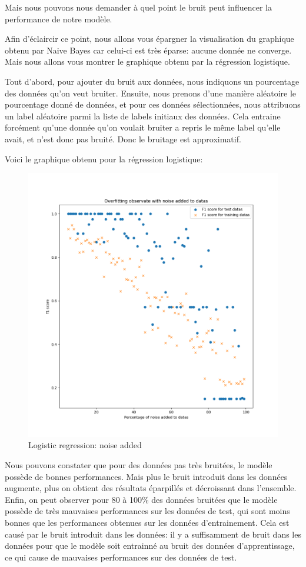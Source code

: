 \documentclass[
]{article}
\begin{document}
Mais nous pouvons nous demander à quel point le bruit peut influencer la
performance de notre modèle.

Afin d'éclaircir ce point, nous allons vous épargner la visualisation du
graphique obtenu par Naive Bayes car celui-ci est très éparse: aucune
donnée ne converge. Mais nous allons vous montrer le graphique obtenu
par la régression logistique.

Tout d'abord, pour ajouter du bruit aux données, nous indiquons un
pourcentage des données qu'on veut bruiter. Ensuite, nous prenons d'une
manière aléatoire le pourcentage donné de données, et pour ces données
sélectionnées, nous attribuons un label aléatoire parmi la liste de
labels initiaux des données. Cela entraine forcément qu'une donnée qu'on
voulait bruiter a repris le même label qu'elle avait, et n'est donc pas
bruité. Donc le bruitage est approximatif.

Voici le graphique obtenu pour la régression logistique:

\begin{figure}
\centering
\includegraphics{../res/overfitting_reg_2.png}
\caption{Logistic regression: noise added}
\end{figure}

Nous pouvons constater que pour des données pas très bruitées, le modèle
possède de bonnes performances. Mais plus le bruit introduit dans les
données augmente, plus on obtient des résultats éparpillés et
décroissant dans l'ensemble. Enfin, on peut observer pour 80 à 100\% des
données bruitées que le modèle possède de très mauvaises performances
sur les données de test, qui sont moins bonnes que les performances
obtenues sur les données d'entrainement. Cela est causé par le bruit
introduit dans les données: il y a suffisamment de bruit dans les
données pour que le modèle soit entrainné au bruit des données
d'apprentissage, ce qui cause de mauvaises performances sur des données
de test.
\end{document}
